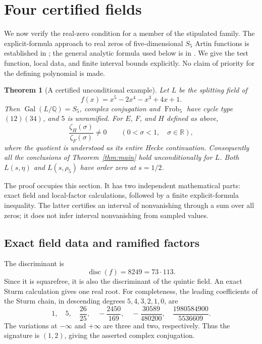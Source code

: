 \documentclass[11pt]{article}
\newtheorem{theorem}{Theorem}[section]
\theoremstyle{definition}
\theoremstyle{remark}
\newcommand{\Q}{\mathbb Q}
\newcommand{\R}{\mathbb R}
\newcommand{\Gal}{\operatorname{Gal}}
\newcommand{\rh}{\rho_5}
\numberwithin{equation}{section}
\begin{document}
\section{Four certified fields}\label{sec:certificate}

We now verify the real-zero condition for a member of the stipulated family. The explicit-formula approach to real zeros of five-dimensional $S_5$ Artin functions is established in \citet{dwyer2014}; the general analytic formula used below is in \citet[Section 3, equation (3--1)]{booker2006}. We give the test function, local data, and finite interval bounds explicitly. No claim of priority for the defining polynomial is made.

\begin{theorem}[A certified unconditional example]\label{thm:8249}
Let $L$ be the splitting field of
\[
f(x)=x^5-2x^4-x^3+4x+1.
\]
Then $\Gal(L/\Q)=S_5$, complex conjugation and $\operatorname{Frob}_5$ have cycle type $(12)(34)$, and $5$ is unramified. For $E$, $F$, and $H$ defined as above,
\[
\frac{\zeta_H(\sigma)}{\zeta_F(\sigma)}\ne0
\qquad(0<\sigma<1,\quad\sigma\in\R),
\]
where the quotient is understood as its entire Hecke continuation. Consequently all the conclusions of Theorem~\ref{thm:main} hold unconditionally for $L$. Both $L(s,\eta)$ and $L(s,\rh)$ have order zero at $s=1/2$.
\end{theorem}

The proof occupies this section. It has two independent mathematical parts: exact field and local-factor calculations, followed by a finite explicit-formula inequality. The latter certifies an interval of nonvanishing through a sum over all zeros; it does not infer interval nonvanishing from sampled values.

\subsection{Exact field data and ramified factors}

The discriminant is
\[
\operatorname{disc}(f)=8249=73\cdot113.
\]
Since it is squarefree, it is also the discriminant of the quintic field. An exact Sturm calculation gives one real root. For completeness, the leading coefficients of the Sturm chain, in descending degrees $5,4,3,2,1,0$, are
\[
1,\quad5,\quad\frac{26}{25},\quad-\frac{2450}{169},\quad
-\frac{30589}{480200},\quad\frac{1980584900}{5536609}.
\]
The variations at $-\infty$ and $+\infty$ are three and two, respectively. Thus the signature is $(1,2)$, giving the asserted complex conjugation.
\end{document}
